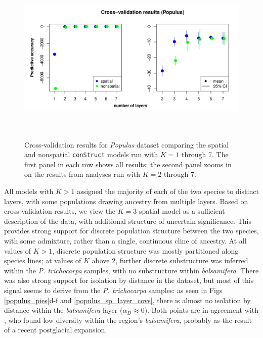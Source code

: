 \documentclass[10pt,letterpaper]{article}
\newcommand{\tri}{\textit{trichocarpa}}
\newcommand{\bals}{\textit{balsamifera}}
\begin{document}
\begin{figure}
	\centering
		{\includegraphics[width=6in,height=3in]{figs/populus/populus_std_xval.pdf}}
	\caption{
	Cross-validation results for \textit{Populus} dataset 
	comparing the spatial and nonspatial \texttt{conStruct} models run with $K=1$ through 7.  
	The first panel in each row shows all results; 
	the second panel zooms in on the results from analyses run with $K = 2$ through 7.
    }\label{populus_xvals}
\end{figure}

All models with $K>1$ assigned the majority of each of the two species
to distinct layers, with some populations drawing ancestry from multiple layers.
Based on cross-validation results, we view the $K=3$ spatial model 
as a sufficient description of the data,
with additional structure of uncertain significance.
This provides strong support for discrete population structure between the two species,
with some admixture,
rather than a single, continuous cline of ancestry.
At all values of $K>1$, discrete population structure was mostly partitioned along species lines; 
at values of $K$ above 2, further discrete substructure was inferred within the \textit{P. trichocarpa} samples,
with no substructure within \bals{}.
There was also strong support for isolation by distance in the dataset, 
but most of this signal seems to derive from the \textit{P. trichocarpa} samples:
as seen in Figs \ref{populus_pies}d-f and \ref{populus_sp_layer_covs},
there is almost no isolation by distance within the \bals{} layer ($\alpha_D \approx 0$).
Both points are
in agreement with \cite{keller_etal_2010}, 
who found low diversity within the region's \bals{},
probably as the result of a recent postglacial expansion.
\end{document}

